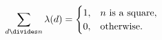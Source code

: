 \[\sum_{d\divides n}\mathop{\lambda\/}\nolimits\!\left(d\right)=\begin{cases}1,&%
n\mbox{ is a square},\\
0,&\mbox{otherwise}.\end{cases}\]